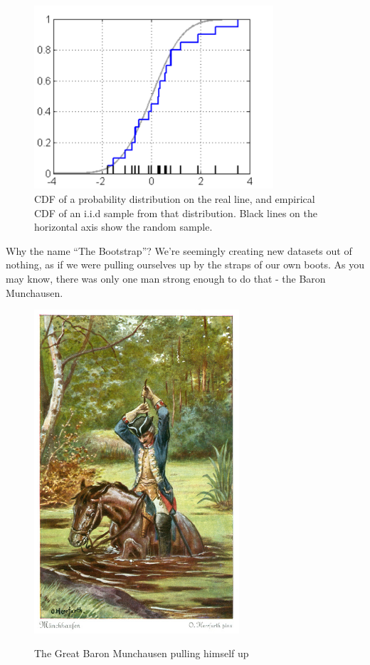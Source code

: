 \begin{figure}[H]
  \centering
  \includegraphics[width=3.5in]{ecdf.pdf}  
  \caption{CDF of a probability distribution on the real line, and empirical CDF
  of an i.i.d sample from that distribution. Black lines on the horizontal axis
show the random sample. }
\label{ecdf}
\end{figure}







\noindent Why the name ``The Bootstrap''? We're seemingly creating new datasets out of nothing, as if we
were pulling ourselves up by the straps of our own boots. As you may know, there was only one man
strong enough to do that - the Baron Munchausen.

\begin{figure}[h!]
  \centering
  \includegraphics[width=3in]{munchausen.jpg}  \\
  \caption{The Great Baron Munchausen pulling himself up}
\end{figure}

